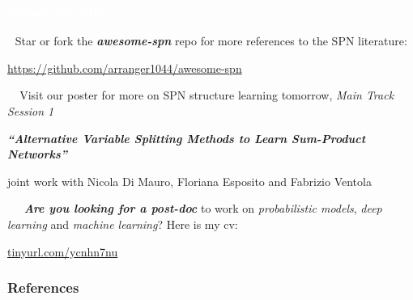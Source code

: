 \documentclass[xcolor={usenames,dvipsnames,svgnames}, compress]{beamer}
\newcommand{\highlighttext}[2][yellow]{{\colorbox{#1}{\textcolor{white}{#2}}}}
\begin{document}
\begin{frame}[t]
  \frametitle{\highlighttext[yellow3]{Shameless plug}}
  \footnotesize
  {\Large\highlighttext[lacamlilac]{I} } Star or fork the \emph{\textbf{awesome-spn}} repo for more references to the SPN literature:\vspace{-5pt}
  \begin{center}
    \large\url{https://github.com/arranger1044/awesome-spn}
  \end{center}\par\bigskip


  {\Large\highlighttext[lacamlilac]{II} }Visit our poster for more on SPN structure learning tomorrow, \emph{Main
  Track Session 1}\vspace{-5pt}
  \begin{center}
    \large{\emph{\textbf{``Alternative Variable Splitting Methods to Learn Sum-Product Networks''}}}
  \end{center}\vspace{-5pt}

   joint work with Nicola Di Mauro, Floriana Esposito and Fabrizio Ventola \par\bigskip\bigskip
  
  {\Large\highlighttext[lacamlilac]{III} }\emph{\textbf{Are you looking for a post-doc}} to work on \emph{probabilistic models}, \emph{deep
    learning} and \emph{machine learning}?
  Here is my cv:\vspace{-5pt}
  \begin{center}
    \large\url{tinyurl.com/ycnhn7nu}
  \end{center}
\end{frame}
 
\begin{frame}[allowframebreaks]
  \frametitle{References}
  \setlength\bibitemsep{8pt}
  \printbibliography
\end{frame}
\end{document}
